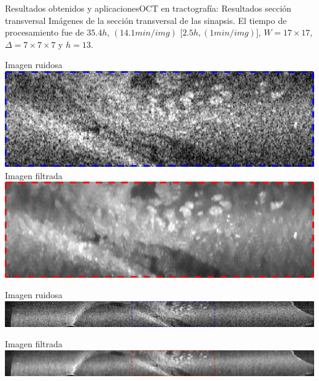 \documentclass[fleqn,10pt]{beamer}
\begin{document}
\begin{frame}{Resultados obtenidos y aplicaciones}{OCT en tractografía: Resultados sección transversal}
	Imágenes de la sección transversal de las sinapsis. El tiempo de procesamiento fue de $35.4h$, $(14.1min/img)$ {\color{violet} [$2.5h, (1min/img)$]}, $W = 17\times17$, $\Delta = 7\times 7\times 7$ y $h=13$.
	
	\begin{multicols}{2}
		\centering
		Imagen ruidosa
		\includegraphics[width=1\linewidth]{AAUgraphics/pt3/Brain/ima_nsy_short_brain_lines}	
		\newpage
		Imagen filtrada
		\includegraphics[width=1\linewidth]{AAUgraphics/pt3/Brain/ima_filt_short_brain_lines}
	\end{multicols}
	\centering
	Imagen ruidosa
	\includegraphics[width=1\linewidth]{AAUgraphics/pt3/Brain/ima_nsy_brain_lines}
	
	Imagen filtrada
	\includegraphics[width=1\linewidth]{AAUgraphics/pt3/Brain/ima_filt_brain_lines}
\end{frame}
\end{document}
